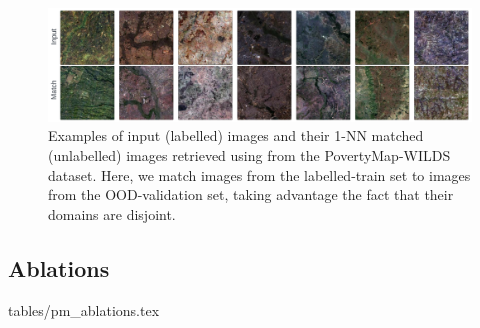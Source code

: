 \begin{figure}[ht!]
  \centering
  \includegraphics[width=1.\textwidth]{figures/matches_examples_pm.pdf}
  \caption{
      Examples of input (labelled) images and their 1-NN matched (unlabelled) images retrieved
      using \CNN{} from the PovertyMap-WILDS dataset.
      Here, we match images from the labelled-train set to images from the \ac{OOD}-validation set,
      taking advantage the fact that their domains are disjoint.
  }
 \end{figure}
 
\subsection{Ablations}\label{appx:ablations}

{tables/pm_ablations.tex}


